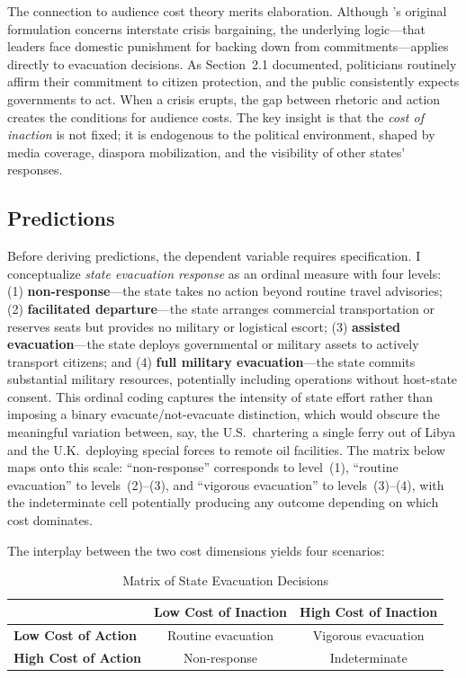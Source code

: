 \documentclass[12pt]{article}
\begin{document}
The connection to audience cost theory merits elaboration. Although \citet{Fearon1994}'s original formulation concerns interstate crisis bargaining, the underlying logic---that leaders face domestic punishment for backing down from commitments---applies directly to evacuation decisions. As Section~2.1 documented, politicians routinely affirm their commitment to citizen protection, and the public consistently expects governments to act. When a crisis erupts, the gap between rhetoric and action creates the conditions for audience costs. The key insight is that the \emph{cost of inaction} is not fixed; it is endogenous to the political environment, shaped by media coverage, diaspora mobilization, and the visibility of other states' responses.

\subsection{Predictions}

Before deriving predictions, the dependent variable requires specification. I conceptualize \emph{state evacuation response} as an ordinal measure with four levels: (1) \textbf{non-response}---the state takes no action beyond routine travel advisories; (2) \textbf{facilitated departure}---the state arranges commercial transportation or reserves seats but provides no military or logistical escort; (3) \textbf{assisted evacuation}---the state deploys governmental or military assets to actively transport citizens; and (4) \textbf{full military evacuation}---the state commits substantial military resources, potentially including operations without host-state consent. This ordinal coding captures the intensity of state effort rather than imposing a binary evacuate/not-evacuate distinction, which would obscure the meaningful variation between, say, the U.S.\ chartering a single ferry out of Libya and the U.K.\ deploying special forces to remote oil facilities. The matrix below maps onto this scale: ``non-response'' corresponds to level~(1), ``routine evacuation'' to levels~(2)--(3), and ``vigorous evacuation'' to levels~(3)--(4), with the indeterminate cell potentially producing any outcome depending on which cost dominates.

The interplay between the two cost dimensions yields four scenarios:

\begin{table}[htbp]
\centering
\caption{Matrix of State Evacuation Decisions}
\label{tab:matrix}
\begin{tabular}{l|cc}
\toprule
 & \textbf{Low Cost of Inaction} & \textbf{High Cost of Inaction} \\
\midrule
\textbf{Low Cost of Action} & Routine evacuation & Vigorous evacuation \\
\textbf{High Cost of Action} & Non-response & Indeterminate \\
\bottomrule
\end{tabular}
\end{table}
\end{document}
